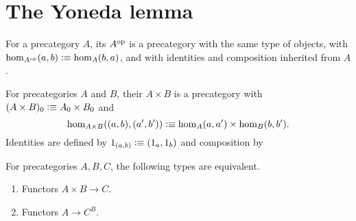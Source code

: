\documentclass[hott-all.tex]{subfiles}
\begin{document}
\section{The Yoneda lemma}
%

\begin{defn}
  For a precategory $A$, its 
  $A^{\mathrm{op}}$ is a precategory with the same type of objects, with $\hom_{A^{\mathrm{op}}}(a,b) \vcentcolon\equiv \hom_A(b,a)$, and with identities and composition inherited from $A$.
\end{defn}

\begin{defn}
  For precategories $A$ and $B$, their 
  $A\times B$ is a precategory with $(A\times B)_0 \vcentcolon\equiv A_0 \times B_0$ and
  \[\hom_{A\times B}((a,b),(a',b')) \vcentcolon\equiv \hom_A(a,a') \times \hom_B(b,b').\]
  Identities are defined by $1_{(a,b)}\vcentcolon\equiv (1_a,1_b)$ and composition by
\end{defn}

\begin{lem}
  For precategories $A,B,C$, the following types are equivalent.
  \begin{enumerate}
  \item Functors $A\times B\to C$.
  \item Functors $A\to C^B$.
  \end{enumerate}
\end{lem}
%
%
\end{document}

